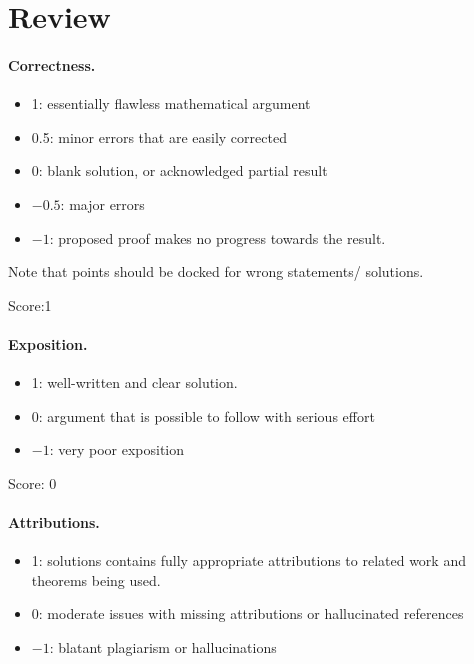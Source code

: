 \documentclass[11pt]{article}
\theoremstyle{remark}
\begin{document}
\maketitle

\section{Review}

\paragraph{Correctness.}
\begin{itemize}
	\item  1: essentially flawless mathematical argument
	\item  0.5: minor errors that are easily corrected
	\item  0: blank solution, or acknowledged partial result
	\item  $-0.5$: major errors
	\item  $-1$: proposed proof makes no progress towards the result.
\end{itemize}
Note that points should be docked for wrong statements/ solutions.

\noindent Score:1

\paragraph{Exposition.}
\begin{itemize}
	\item  1: well-written and clear solution.
	\item  0: argument that is possible to follow with serious effort
	\item  $-1$: very poor exposition
\end{itemize}

\noindent Score: 0

\paragraph{Attributions.}
\begin{itemize}
	\item  1: solutions contains fully appropriate attributions
		to related work and theorems being used.
	\item  0: moderate issues with missing attributions or hallucinated references
	\item  $-1$: blatant plagiarism or hallucinations
\end{itemize}
\end{document}
